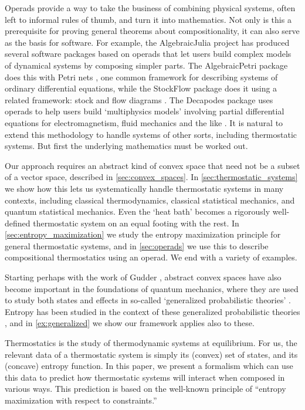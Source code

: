 \documentclass[12pt, reqno]{amsart}
\begin{document}
Operads provide a way to take the business of combining physical systems, often left to informal rules of thumb, and turn it into mathematics.  Not only is this a prerequisite for proving general theorems about compositionality, it can also serve as the basis for software.  For example, the AlgebraicJulia project has produced several software packages based on operads that let users build complex models of dynamical systems by composing simpler parts.  The AlgebraicPetri package does this with Petri nets \cite{BFLP}, one common framework for describing systems of ordinary differential equations, while the StockFlow package does it using a related framework: stock and flow diagrams \cite{BLLOP}.  The Decapodes package uses operads to help users build `multiphysics models' involving partial differential equations for electromagnetism, fluid mechanics and the like \cite{BFHP}.   It is natural to extend this methodology to handle systems of other sorts, including thermostatic systems.  But first the underlying mathematics must be worked out.

Our approach requires an abstract kind of convex space that need not be a subset of a vector space, described in \cref{sec:convex_spaces}. In \cref{sec:thermostatic_systems} we show how this lets us systematically handle thermostatic systems in many contexts, including classical thermodynamics, classical statistical mechanics, and quantum statistical mechanics. Even the `heat bath' becomes a rigorously well-defined thermostatic system on an equal footing with the rest. In \cref{sec:entropy_maximization} we study the entropy maximization principle for general thermostatic systems, and in \cref{sec:operads} we use this to describe compositional thermostatics using an operad. We end with a variety of examples.

Starting perhaps with the work of Gudder \cite{Gudder1977}, abstract convex spaces have also become important in the foundations of quantum mechanics, where they are used to study both states and effects in so-called `generalized probabilistic theories' \cite{Jacobs}. Entropy has been studied in the context of these generalized probabilistic theories \cite{Barnum_et_al, Krumm_et_al,ShortWehner}, and in \cref{ex:generalized} we show our framework applies also to these.



\iffalse
Thermostatics is the study of thermodynamic systems at equilibrium. For us, the relevant data of a thermostatic system is simply its (convex) set of states, and its (concave) entropy function. In this paper, we present a formalism which can use this data to predict how thermostatic systems will interact when composed in various ways. This prediction is based on the well-known principle of ``entropy maximization with respect to constraints.''
\end{document}
